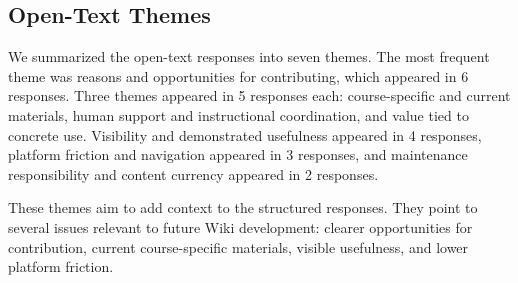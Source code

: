\documentclass[11pt]{article}
\newcommand{\td}[1]{\item \textcolor{red!70!black}{TODO: #1}}
\begin{document}
\subsection{Open-Text Themes}
We summarized the open-text responses into seven themes. The most frequent theme was reasons and opportunities for contributing, which appeared in 6 responses. Three themes appeared in 5 responses each: course-specific and current materials, human support and instructional coordination, and value tied to concrete use. Visibility and demonstrated usefulness appeared in 4 responses, platform friction and navigation appeared in 3 responses, and maintenance responsibility and content currency appeared in 2 responses.

These themes aim to add context to the structured responses. They point to several issues relevant to future Wiki development: clearer opportunities for contribution, current course-specific materials, visible usefulness, and lower platform friction.
\end{document}
